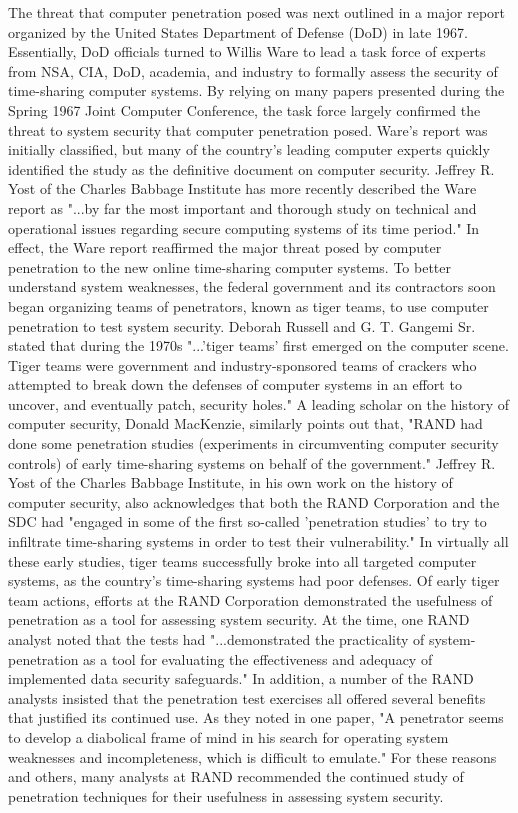 The threat that computer penetration posed was next outlined in a major report organized by the United States Department of Defense (DoD) in late 1967. Essentially, DoD officials turned to Willis Ware to lead a task force of experts from NSA, CIA, DoD, academia, and industry to formally assess the security of time-sharing computer systems. By relying on many papers presented during the Spring 1967 Joint Computer Conference, the task force largely confirmed the threat to system security that computer penetration posed. Ware's report was initially classified, but many of the country's leading computer experts quickly identified the study as the definitive document on computer security. Jeffrey R. Yost of the Charles Babbage Institute has more recently described the Ware report as "...by far the most important and thorough study on technical and operational issues regarding secure computing systems of its time period." In effect, the Ware report reaffirmed the major threat posed by computer penetration to the new online time-sharing computer systems.
To better understand system weaknesses, the federal government and its contractors soon began organizing teams of penetrators, known as tiger teams, to use computer penetration to test system security. Deborah Russell and G. T. Gangemi Sr. stated that during the 1970s "...'tiger teams' first emerged on the computer scene. Tiger teams were government and industry-sponsored teams of crackers who attempted to break down the defenses of computer systems in an effort to uncover, and eventually patch, security holes."
A leading scholar on the history of computer security, Donald MacKenzie, similarly points out that, "RAND had done some penetration studies (experiments in circumventing computer security controls) of early time-sharing systems on behalf of the government." Jeffrey R. Yost of the Charles Babbage Institute, in his own work on the history of computer security, also acknowledges that both the RAND Corporation and the SDC had "engaged in some of the first so-called 'penetration studies' to try to infiltrate time-sharing systems in order to test their vulnerability." In virtually all these early studies, tiger teams successfully broke into all targeted computer systems, as the country's time-sharing systems had poor defenses.
Of early tiger team actions, efforts at the RAND Corporation demonstrated the usefulness of penetration as a tool for assessing system security. At the time, one RAND analyst noted that the tests had "...demonstrated the practicality of system-penetration as a tool for evaluating the effectiveness and adequacy of implemented data security safeguards." In addition, a number of the RAND analysts insisted that the penetration test exercises all offered several benefits that justified its continued use. As they noted in one paper, "A penetrator seems to develop a diabolical frame of mind in his search for operating system weaknesses and incompleteness, which is difficult to emulate." For these reasons and others, many analysts at RAND recommended the continued study of penetration techniques for their usefulness in assessing system security.

